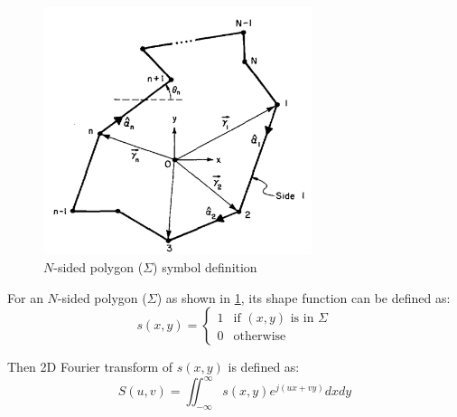 \begin{figure}[H]
  \centering
  \includegraphics[width=0.7\textwidth]{polygon_analytical_FT_symbol_definition.png}
  \caption{$N$-sided polygon ($\varSigma$) symbol definition \cite{Lee1983}}
  \label{fig:polygon_analytical_FT_symbol_definition}
\end{figure}

For an $N$-sided polygon ($\varSigma$) as shown in \cref{fig:polygon_analytical_FT_symbol_definition}, its shape function can be defined as:
\begin{equation}
  s(x,y) = \begin{cases}
    1 & \text{if $(x,y)$ is in $\varSigma$} \\
    0 & \text{otherwise}
  \end{cases}
\end{equation}

Then 2D Fourier transform of $s(x,y)$ is defined as:
\begin{equation}
  S(u,v) = \iint_{-\infty }^{\infty} s(x,y)e^{j(ux+vy)}dxdy
\end{equation}

